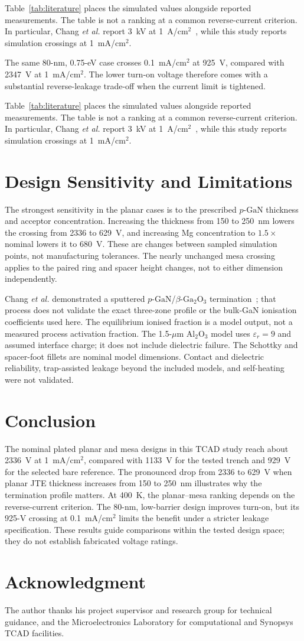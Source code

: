 \documentclass[journal,10pt]{IEEEtran}
\newcommand{\GaO}{\ensuremath{\beta\text{-}\mathrm{Ga}_2\mathrm{O}_3}}
\newcommand{\pGaN}{\ensuremath{p\text{-}\mathrm{GaN}}}
\begin{document}
Table~\ref{tab:literature} places the simulated values alongside reported measurements. The table is not a ranking at a common reverse-current criterion. In particular, Chang \emph{et al.} report 3~kV at 1~A/cm$^2$~\cite{Chang2025_APL}, while this study reports simulation crossings at 1~mA/cm$^2$.

The same 80-nm, 0.75-eV case crosses 0.1~mA/cm$^2$ at 925~V, compared with 2347~V at 1~mA/cm$^2$. The lower turn-on voltage therefore comes with a substantial reverse-leakage trade-off when the current limit is tightened.

Table~\ref{tab:literature} places the simulated values alongside reported measurements. The table is not a ranking at a common reverse-current criterion. In particular, Chang \emph{et al.} report 3~kV at 1~A/cm$^2$~\cite{Chang2025_APL}, while this study reports simulation crossings at 1~mA/cm$^2$.

\section{Design Sensitivity and Limitations}
The strongest sensitivity in the planar cases is to the prescribed \pGaN{} thickness and acceptor concentration. Increasing the thickness from 150 to 250~nm lowers the crossing from 2336 to 629~V, and increasing Mg concentration to $1.5\times$ nominal lowers it to 680~V. These are changes between sampled simulation points, not manufacturing tolerances. The nearly unchanged mesa crossing applies to the paired ring and spacer height changes, not to either dimension independently.

Chang \emph{et al.} demonstrated a sputtered \pGaN/\GaO{} termination~\cite{Chang2025_APL}; that process does not validate the exact three-zone profile or the bulk-GaN ionisation coefficients used here. The equilibrium ionised fraction is a model output, not a measured process activation fraction. The 1.5-$\mu$m Al$_2$O$_3$ model uses $\varepsilon_r=9$ and assumed interface charge; it does not include dielectric failure. The Schottky and spacer-foot fillets are nominal model dimensions. Contact and dielectric reliability, trap-assisted leakage beyond the included models, and self-heating were not validated.

\section{Conclusion}
The nominal plated planar and mesa designs in this TCAD study reach about 2336~V at 1~mA/cm$^2$, compared with 1133~V for the tested trench and 929~V for the selected bare reference. The pronounced drop from 2336 to 629~V when planar JTE thickness increases from 150 to 250~nm illustrates why the termination profile matters. At 400~K, the planar--mesa ranking depends on the reverse-current criterion. The 80-nm, low-barrier design improves turn-on, but its 925-V crossing at 0.1~mA/cm$^2$ limits the benefit under a stricter leakage specification. These results guide comparisons within the tested design space; they do not establish fabricated voltage ratings.

\section*{Acknowledgment}
The author thanks his project supervisor and research group for technical guidance, and the Microelectronics Laboratory for computational and Synopsys TCAD facilities.



\end{document}
